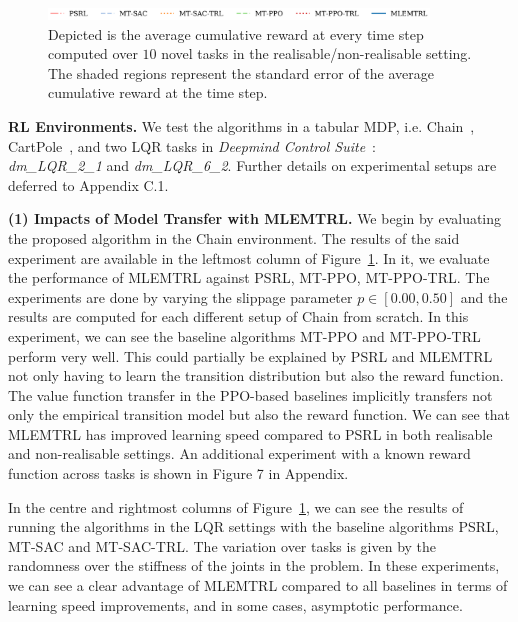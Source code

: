 \begin{figure}[t!]
    \includegraphics[width=0.9\textwidth]{img/lqr_legend.pdf}
    \caption{Depicted is the average cumulative reward at every time step computed over $10$ novel tasks in the realisable/non-realisable setting. The shaded regions represent the standard error of the average cumulative reward at the time step.}\label{fig:full_results}%
\end{figure}


\noindent\textbf{RL Environments.} We test the algorithms in a tabular MDP, i.e. Chain~\citep{dearden1998bayesian}, CartPole~\citep{barto1983neuronlike}, and two LQR tasks in \emph{Deepmind Control Suite}~\citep{tassa2018deepmind}: \\ \emph{dm\_LQR\_2\_1} and \emph{dm\_LQR\_6\_2}. %
Further details on experimental setups are deferred to Appendix C.1.


\noindent\textbf{(1) Impacts of Model Transfer with MLEMTRL.}\label{sec:impacts} We begin by evaluating the proposed algorithm in the Chain environment. The results of the said experiment are available in the leftmost column of Figure~\ref{fig:full_results}. In it, we evaluate the performance of MLEMTRL against PSRL, MT-PPO, MT-PPO-TRL. The experiments are done by varying the slippage parameter $p \in [0.00, 0.50]$ and the results are computed for each different setup of Chain from scratch. In this experiment, we can see the baseline algorithms MT-PPO and MT-PPO-TRL perform very well. This could partially be explained by PSRL and MLEMTRL not only having to learn the transition distribution but also the reward function. The value function transfer in the PPO-based baselines implicitly transfers not only the empirical transition model but also the reward function. We can see that MLEMTRL has improved learning speed compared to PSRL in both realisable and non-realisable settings. 
An additional experiment with a known reward function across tasks is shown in %
Figure 7 in Appendix.

In the centre and rightmost columns of Figure~\ref{fig:full_results}, we can see the results of running the algorithms in the LQR settings with the baseline algorithms PSRL, MT-SAC and MT-SAC-TRL. The variation over tasks is given by the randomness over the stiffness of the joints in the problem. In these experiments, we can see a clear advantage of MLEMTRL compared to all baselines in terms of learning speed improvements, and in some cases, asymptotic performance.

